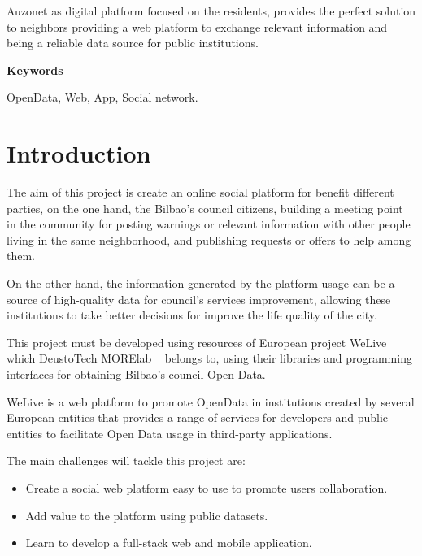 \documentclass{DeustoFDP}
\begin{document}
Auzonet as digital platform focused on the residents, provides the perfect solution to neighbors providing a web platform to exchange relevant information and being a reliable data source for public institutions.

\vspace{2em}

{\Large\bfseries\sectionfont Keywords}
\vspace{3\medskipamount}

OpenData, Web, App, Social network.

\cleardoublepage\tableofcontents
\cleardoublepage\listoffigures
\cleardoublepage\listoftables
\cleardoublepage\listoflistings

\mainmatter
\pagestyle{phdthesis}

\chapter{Introduction}\label{cha:introduction}
The aim of this project is create an online social platform for benefit different parties, on the one hand, the Bilbao's council citizens, building a meeting point in the community for posting warnings or relevant information with other people living in the same neighborhood, and publishing requests or offers to help among them.

On the other hand, the information generated by the platform usage can be a source of high-quality data for council's services improvement, allowing these institutions to take better decisions for improve the life quality of the city.

This project must be developed using resources of European project WeLive ~\cite{WeLive} which DeustoTech \cite{DeustoTech} MORElab ~\cite{Morelab} belongs to, using their libraries and programming interfaces for obtaining Bilbao's council Open Data. 

WeLive is a web platform to promote OpenData in institutions created by several European entities that provides a range of services for developers and public entities to facilitate Open Data usage in third-party applications.

The main challenges will tackle this project are:

\begin{itemize}
    \item Create a social web platform easy to use to promote users collaboration.
    \item Add value to the platform using public datasets.
    \item Learn to develop a full-stack web and mobile application.
\end{itemize}
\end{document}

